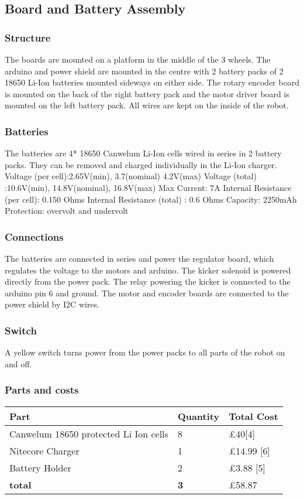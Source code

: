 \documentclass[a4paper]{article}
\begin{document}
\subsection{Board and Battery Assembly}
\subsubsection{Structure}
The boards are mounted on a platform in the middle of the 3 wheels. The arduino and power
shield are mounted in the centre with 2 battery packs of 2 18650 Li-Ion batteries mounted sideways on either side. The rotary encoder board is
mounted on the back of the right battery pack and the motor driver board is mounted
on the left battery pack. All wires are kept on the inside of the robot.

\subsubsection{Batteries}
The batteries are 4* 18650 Canwelum Li-Ion cells wired in series in 2 battery packs. They can be removed and charged individually in the Li-Ion charger.
	Voltage (per cell):2.65V(min), 3.7(nominal) 4.2V(max)
    Voltage (total)   :10.6V(min), 14.8V(nominal), 16.8V(max)
    Max Current: 7A
    Internal Resistance (per cell): 0.150 Ohms
    Internal Resistance (total)   : 0.6   Ohms
    Capacity: 2250mAh
	Protection: overvolt and undervolt   
    
\subsubsection{Connections}
The batteries are connected in series and power the regulator board, which regulates the voltage to the motors and arduino. The kicker solenoid is powered directly from the power pack. The relay powering the kicker is connected to the arduino pin 6 and ground. The motor and encoder boards are connected to the power shield by I2C wires. 
\subsubsection{Switch}
A yellow switch turns power from the power packs to all parts of the robot on and off.

\subsubsection{Parts and costs}
\begin{center}
\begin{tabular}{ | m{3cm} | m{3cm}| m{6cm} | }
\hline
\textbf{Part} & \textbf{Quantity} & \textbf{Total Cost} \\
\hline
Canwelum 18650 protected Li Ion cells & 8 &  £40[4] \\
\hline
Nitecore Charger & 1 & £14.99 [6]\\
\hline
Battery Holder & 2 & £3.88 [5]\\
\hline
\textbf{total} & \textbf{3} & £58.87 \\
\hline
\end{tabular}
\end{center}
\end{document}
